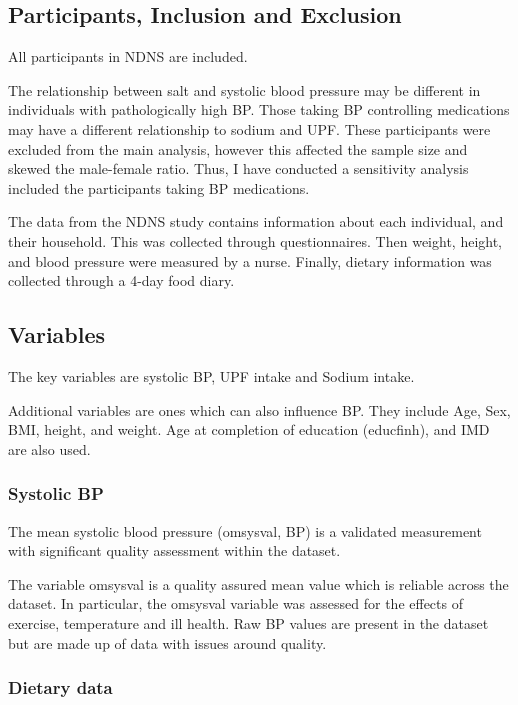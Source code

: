 \documentclass[
]{article}
\begin{document}
\hypertarget{participants-inclusion-and-exclusion}{%
\subsection{Participants, Inclusion and
Exclusion}\label{participants-inclusion-and-exclusion}}

All participants in NDNS are included.

The relationship between salt and systolic blood pressure may be
different in individuals with pathologically high BP. Those taking BP
controlling medications may have a different relationship to sodium and
UPF. These participants were excluded from the main analysis, however
this affected the sample size and skewed the male-female ratio. Thus, I
have conducted a sensitivity analysis included the participants taking
BP medications.

The data from the NDNS study contains information about each individual,
and their household. This was collected through questionnaires. Then
weight, height, and blood pressure were measured by a nurse. Finally,
dietary information was collected through a 4-day food diary.

\hypertarget{variables}{%
\subsection{Variables}\label{variables}}

The key variables are systolic BP, UPF intake and Sodium intake.

Additional variables are ones which can also influence BP. They include
Age, Sex, BMI, height, and weight. Age at completion of education
(educfinh), and IMD are also used.

\hypertarget{systolic-bp}{%
\subsubsection{Systolic BP}\label{systolic-bp}}

The mean systolic blood pressure (omsysval, BP) is a validated
measurement with significant quality assessment within the dataset.

The variable omsysval is a quality assured mean value which is reliable
across the dataset. In particular, the omsysval variable was assessed
for the effects of exercise, temperature and ill health. Raw BP values
are present in the dataset but are made up of data with issues around
quality.

\hypertarget{dietary-data}{%
\subsubsection{Dietary data}\label{dietary-data}}
\end{document}
